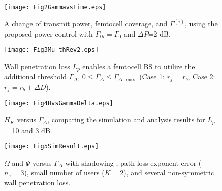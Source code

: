 \documentclass[draftclsnofoot,12pt,onecolumn]{IEEEtran}
\begin{document}
\begin{figure}
\begin{center}
\texttt{[image: Fig2Gammavstime.eps]}
    \caption{A change of transmit power, femtocell coverage, and $\Gamma^{(i)}$, using the proposed power control with $\Gamma_{th}=\Gamma_0$ and $\Delta P$=2 dB.}
    \label{fig:Gamma}
\end{center}
\end{figure}



\begin{figure}
\begin{center}
   \texttt{[image: Fig3Mu\_thRev2.eps]}
    \caption{Wall penetration loss $L_p$ enables a femtocell BS to utilize the additional threshold
    $\Gamma_{\Delta}$, $0\leq\Gamma_{\Delta}\leq\Gamma_{\Delta,\max}$ (Case 1: $r_f=r_b$, Case 2: $r_f=r_b+\Delta D$).}
    \label{fig:Margin}
\end{center}
\end{figure}



\begin{figure}[h]
\begin{center}
\texttt{[image: Fig4HvsGammaDelta.eps]}
    \caption{$H_K$ versus $\Gamma_\Delta$, comparing the simulation and analysis results for $L_p$ = 10 and 3 dB.}
    \label{fig:Result1}
\end{center}
\end{figure}

\begin{figure}[h]
\begin{center}
   \texttt{[image: Fig5SimResult.eps]}
    \caption{$\Omega$ and $\Psi$ versus $\Gamma_\Delta$ with shadowing , path loss exponent error ($n_e=3$), small number of users ($K=2$), and several non-symmetric wall penetration loss.}
    \label{fig:Result2}
\end{center}
\end{figure}
\end{document}
